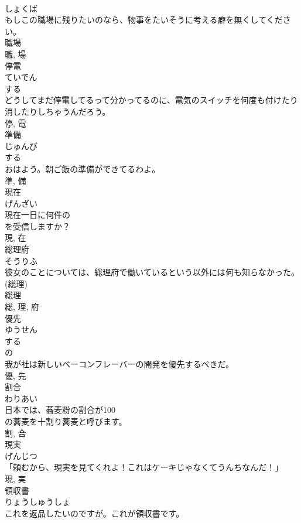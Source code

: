 \documentclass[8pt]{extreport}
\begin{document}
\begin{CJK}{UTF8}{min}
\\	しょくば	
\\	もしこの職場に残りたいのなら、物事をたいそうに考える癖を無くしてください。	
\\	職場 
\\	職, 場	
\\	停電	
\\	ていでん	
\\	する 
\\	どうしてまだ停電してるって分かってるのに、電気のスイッチを何度も付けたり消したりしちゃうんだろう。	
\\	停, 電	
\\	準備	
\\	じゅんび	
\\	する 
\\	おはよう。朝ご飯の準備ができてるわよ。	
\\	準, 備	
\\	現在	
\\	げんざい	
\\	現在一日に何件の
\\	を受信しますか？	
\\	現, 在	
\\	総理府	
\\	そうりふ	
\\	彼女のことについては、総理府で働いているという以外には何も知らなかった。	
\\	(総理) 
\\	総理 
\\	総, 理, 府	
\\	優先	
\\	ゆうせん	
\\	する 
\\	の 
\\	我が社は新しいベーコンフレーバーの開発を優先するべきだ。	
\\	優, 先	
\\	割合	
\\	わりあい	
\\	日本では、蕎麦粉の割合が100
\\	の蕎麦を十割り蕎麦と呼びます。	
\\	割, 合	
\\	現実	
\\	げんじつ	
\\	「頼むから、現実を見てくれよ！これはケーキじゃなくてうんちなんだ！」	
\\	現, 実	
\\	領収書	
\\	りょうしゅうしょ	
\\	これを返品したいのですが。これが領収書です。	

\end{CJK}
\end{document}
